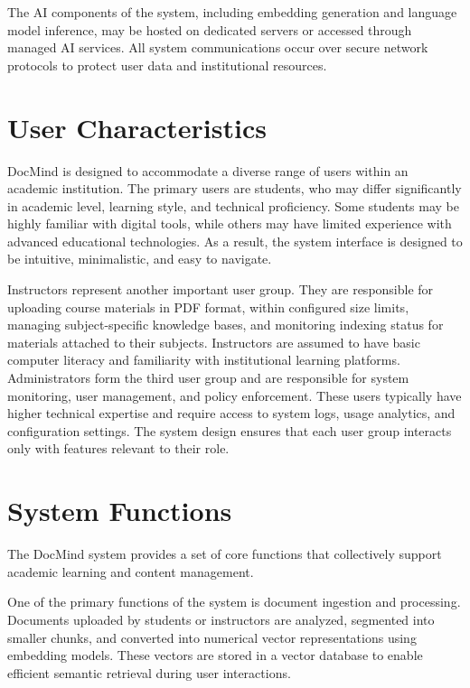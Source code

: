 \documentclass[12pt, a4paper, oneside]{report}
\let\oldsection\section
\renewcommand{\section}{%
  \addtocontents{toc}{\protect\needspace{4\baselineskip}}%
  \oldsection
}
\begin{document}
The AI components of the system, including embedding generation and language model inference, may be hosted on dedicated servers or accessed through managed AI services. All system communications occur over secure network protocols to protect user data and institutional resources.

\section{User Characteristics}

DocMind is designed to accommodate a diverse range of users within an academic institution. The primary users are students, who may differ significantly in academic level, learning style, and technical proficiency. Some students may be highly familiar with digital tools, while others may have limited experience with advanced educational technologies. As a result, the system interface is designed to be intuitive, minimalistic, and easy to navigate.

Instructors represent another important user group. They are responsible for uploading course materials in PDF format, within configured size limits, managing subject-specific knowledge bases, and monitoring indexing status for materials attached to their subjects. Instructors are assumed to have basic computer literacy and familiarity with institutional learning platforms.
\newpage
Administrators form the third user group and are responsible for system monitoring, user management, and policy enforcement. These users typically have higher technical expertise and require access to system logs, usage analytics, and configuration settings. The system design ensures that each user group interacts only with features relevant to their role.

\section{System Functions}

The DocMind system provides a set of core functions that collectively support academic learning and content management.

One of the primary functions of the system is document ingestion and processing. Documents uploaded by students or instructors are analyzed, segmented into smaller chunks, and converted into numerical vector representations using embedding models. These vectors are stored in a vector database to enable efficient semantic retrieval during user interactions.
\end{document}
